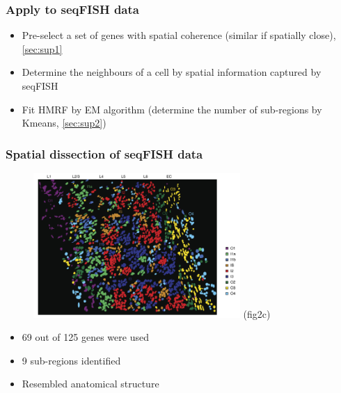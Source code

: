 \documentclass{beamer}
\begin{document}
  \begin{frame}
  \frametitle{Apply to seqFISH data}
  \begin{itemize}
    \item Pre-select a set of genes with spatial coherence (similar if spatially close), \cref{sec:sup1}
    \item Determine the neighbours of a cell by spatial information captured by seqFISH
    \item Fit HMRF by EM algorithm (determine the number of sub-regions by Kmeans, \cref{sec:sup2})
  \end{itemize}
  \end{frame}

  \begin{frame}
  \frametitle{Spatial dissection of seqFISH data}
  \begin{figure}
    \centering
    \includegraphics[width=0.7\textwidth]{subregion} (fig2c)
  \end{figure}
  \begin{itemize}
    \item 69 out of 125 genes were used
    \item 9 sub-regions identified
    \item Resembled anatomical structure
  \end{itemize}
  \end{frame}
\end{document}
